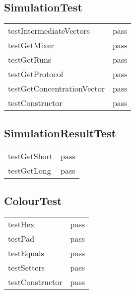 \subsection*{SimulationTest}
\begin{tabular}{l|l}
testIntermediateVectors       & pass \\
testGetMixer                         & pass \\
testGetRuns                          & pass \\
testGetProtocol                     & pass \\
testGetConcentrationVector & pass \\
testConstructor                    & pass \\
\end{tabular}

\subsection*{SimulationResultTest}
\begin{tabular}{l|l}
testGetShort & pass \\
testGetLong  & pass \\
\end{tabular}

\subsection*{ColourTest}
\begin{tabular}{l|l}
testHex             & pass \\
testPad             & pass \\
testEquals         & pass \\
testSetters        & pass \\
testConstructor & pass \\
\end{tabular}